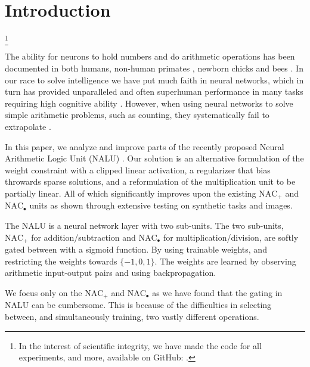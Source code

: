 \section{Introduction}\footnote{In the interest of scientific integrity, we have made the code for all experiments, and more, available on GitHub: .}

The ability for neurons to hold numbers and do arithmetic operations has been documented in both humans, non-human primates \cite{nieder-neuronal-number}, newborn chicks \cite{rugani-arithmetic-chicks} and bees \cite{gallistel-numbers-in-brain}.
In our race to solve intelligence we have put much faith in neural networks, which in turn has provided unparalleled and often superhuman performance in many tasks requiring high cognitive ability \cite{natureGo,googleNMT,resnet}.
However, when using neural networks to solve simple arithmetic problems, such as counting, they systematically fail to extrapolate \cite{stillNotSystematic,suzgun2019evaluating,trask-nalu}.

In this paper, we analyze and improve parts of the recently proposed Neural Arithmetic Logic Unit (NALU) \cite{trask-nalu}. Our solution is an alternative formulation of the weight constraint with a clipped linear activation, a regularizer that bias throwards sparse solutions, and a reformulation of the multiplication unit to be partially linear. All of which significantly improves upon the existing $\text{NAC}_{+}$ and $\text{NAC}_{\bullet}$ units as shown through extensive testing on synthetic tasks and images.

The NALU is a neural network layer with two sub-units. The two sub-units, $\text{NAC}_{+}$ for addition/subtraction and $\text{NAC}_{\bullet}$ for multiplication/division, are softly gated between with a sigmoid function. By using trainable weights, and restricting the weights towards $\{-1,0,1\}$. The weights are learned by observing arithmetic input-output pairs and using backpropagation\cite{rumelhart1986learning}.

We focus only on the $\text{NAC}_{+}$ and $\text{NAC}_{\bullet}$ as we have found that the gating in NALU can be cumbersome. This is because of the difficulties in selecting between, and simultaneously training, two vastly different operations. 

